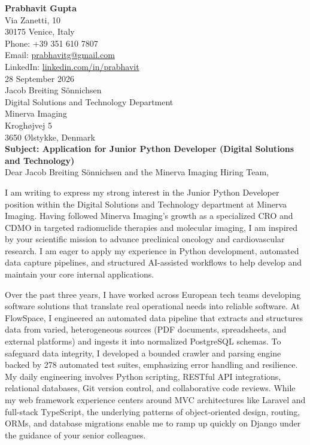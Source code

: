 \documentclass[10pt,a4paper]{article}
\begin{document}
\textbf{\large \color{primary} Prabhavit Gupta} \\
Via Zanetti, 10 \\
30175 Venice, Italy \\
Phone: +39 351 610 7807 \\
Email: \href{mailto:prabhavitg@gmail.com}{prabhavitg@gmail.com} \\
LinkedIn: \href{https://www.linkedin.com/in/prabhavit/}{linkedin.com/in/prabhavit} \\[12pt]

28 September 2026 \\[10pt]

Jacob Breiting Sönnichsen \\
Digital Solutions and Technology Department \\
Minerva Imaging \\
Kroghøjvej 5 \\
3650 Ølstykke, Denmark \\[12pt]

\textbf{\color{primary} Subject: Application for Junior Python Developer (Digital Solutions and Technology)} \\[8pt]

Dear Jacob Breiting Sönnichsen and the Minerva Imaging Hiring Team,

I am writing to express my strong interest in the Junior Python Developer position within the Digital Solutions and Technology department at Minerva Imaging. Having followed Minerva Imaging's growth as a specialized CRO and CDMO in targeted radionuclide therapies and molecular imaging, I am inspired by your scientific mission to advance preclinical oncology and cardiovascular research. I am eager to apply my experience in Python development, automated data capture pipelines, and structured AI-assisted workflows to help develop and maintain your core internal applications.

Over the past three years, I have worked across European tech teams developing software solutions that translate real operational needs into reliable software. At FlowSpace, I engineered an automated data pipeline that extracts and structures data from varied, heterogeneous sources (PDF documents, spreadsheets, and external platforms) and ingests it into normalized PostgreSQL schemas. To safeguard data integrity, I developed a bounded crawler and parsing engine backed by 278 automated test suites, emphasizing error handling and resilience. My daily engineering involves Python scripting, RESTful API integrations, relational databases, Git version control, and collaborative code reviews. While my web framework experience centers around MVC architectures like Laravel and full-stack TypeScript, the underlying patterns of object-oriented design, routing, ORMs, and database migrations enable me to ramp up quickly on Django under the guidance of your senior colleagues.
\end{document}
